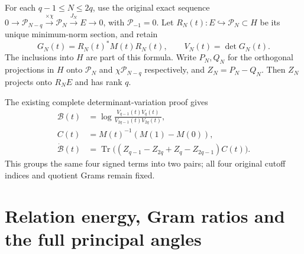 \documentclass[11pt]{article}
\newcommand{\Tr}{\operatorname{Tr}}
\newcommand{\cP}{\mathcal P}
\begin{document}
For each $q-1\le N\le2q$, use the original exact sequence
$0\to\cP_{N-q}\xrightarrow{\times\chi}\cP_N
\xrightarrow{J_N}E\to0$, with $\cP_{-1}=0$.
Let $R_N(t):E\hookrightarrow\cP_N\subset H$ be its unique
minimum-norm section, and retain
\[
 G_N(t)=R_N(t)^*M(t)R_N(t),\qquad V_N(t)=\det G_N(t).
 \tag{AGT3}
\]
The inclusions into $H$ are part of this formula.
Write $P_N,Q_N$ for the orthogonal projections in $H$ onto
$\cP_N$ and $\chi\cP_{N-q}$ respectively, and
$Z_N=P_N-Q_N$. Then $Z_N$ projects onto $R_NE$ and has rank $q$.

The existing complete determinant-variation proof gives
\[
 \begin{aligned}
 \mathcal B(t)&=\log\frac{V_{q-1}(t)V_q(t)}
                              {V_{2q-1}(t)V_{2q}(t)},\\
 C(t)&=M(t)^{-1}(M(1)-M(0)),\\
 \dot{\mathcal B}(t)
 &=\Tr\bigl((Z_{q-1}-Z_{2q}+Z_q-Z_{2q-1})C(t)\bigr).
 \end{aligned}
 \tag{AGT4}
\]
This groups the same four signed terms into two pairs; all four
original cutoff indices and quotient Grams remain fixed.

\section{Relation energy, Gram ratios and the full principal angles}
\end{document}
